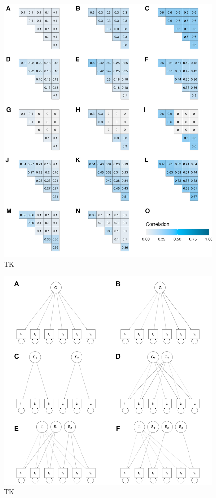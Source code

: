 \documentclass[man, 12pt]{apa7} %
\begin{document}
\begin{figure}[htbp]
    \centering  %
    \includegraphics[width=\linewidth, height=1.1\linewidth, keepaspectratio]{_figs/true_cors.png}
    \caption{TK}  %
    \label{fig:true_cors}
\end{figure}


\begin{figure}[htbp]
    \centering  %
    \includegraphics[width=\linewidth, height=1.1\linewidth, keepaspectratio]{_figs/factor_tree.png}
    \caption{TK}  %
    \label{fig:fac_st}
\end{figure}
\end{document}

